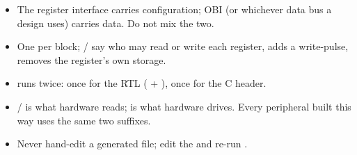 \begin{itemize}
  \item The register interface carries configuration; OBI (or whichever
        data bus a design uses) carries data. Do not mix the two.
  \item One  per block; / say who
        may read or write each register,  adds a write-pulse,
         removes the register's own storage.
  \item {} runs  twice: once for the RTL
        ( + ), once for the C header.
  \item {}/ is what hardware reads;
         is what hardware drives. Every peripheral built
        this way uses the same two suffixes.
  \item Never hand-edit a generated file; edit the  and
        re-run .
\end{itemize}
